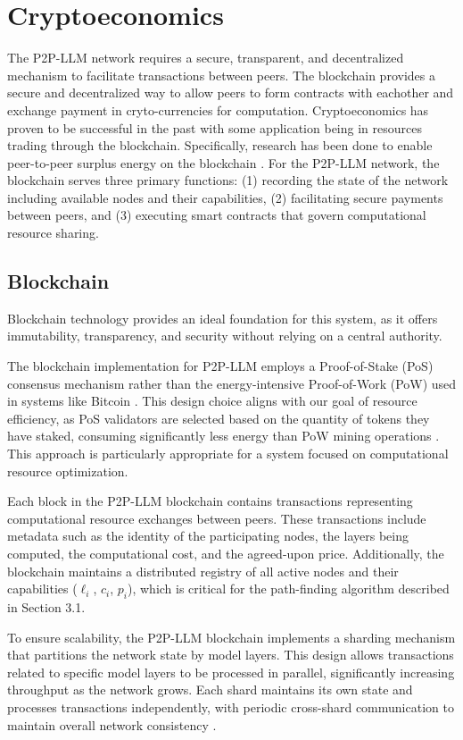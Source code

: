 \documentclass[preprint,twoside,11pt]{article}
\begin{document}
\section{Cryptoeconomics}
The P2P-LLM network requires a secure, transparent, and decentralized mechanism to facilitate transactions between peers.
The blockchain provides a secure and decentralized way to allow peers to form contracts with eachother
and exchange payment in cryto-currencies for computation.
Cryptoeconomics has proven to be successful in the past with some application being in
resources trading through the blockchain. Specifically, research has been done to enable peer-to-peer surplus energy on the blockchain \citep{WONGTHONGTHAM2021107299}.
For the P2P-LLM network, the blockchain serves three primary functions: (1) recording the state of the network including available nodes and their capabilities, (2) facilitating secure payments between peers, and (3) executing smart contracts that govern computational resource sharing.

\subsection{Blockchain}

Blockchain technology provides an ideal foundation for this system, as it offers immutability, transparency, and security without relying on a central authority.

The blockchain implementation for P2P-LLM employs a Proof-of-Stake (PoS) consensus mechanism rather than the energy-intensive Proof-of-Work (PoW) used in systems like Bitcoin \citep{nakamoto2008bitcoin}. This design choice aligns with our goal of resource efficiency, as PoS validators are selected based on the quantity of tokens they have staked, consuming significantly less energy than PoW mining operations \citep{saleh2021blockchain}. This approach is particularly appropriate for a system focused on computational resource optimization.

Each block in the P2P-LLM blockchain contains transactions representing computational resource exchanges between peers. These transactions include metadata such as the identity of the participating nodes, the layers being computed, the computational cost, and the agreed-upon price. Additionally, the blockchain maintains a distributed registry of all active nodes and their capabilities ($\ell_i$, $c_i$, $p_i$), which is critical for the path-finding algorithm described in Section 3.1.

To ensure scalability, the P2P-LLM blockchain implements a sharding mechanism that partitions the network state by model layers. This design allows transactions related to specific model layers to be processed in parallel, significantly increasing throughput as the network grows. Each shard maintains its own state and processes transactions independently, with periodic cross-shard communication to maintain overall network consistency \citep{yu2020survey}.
\end{document}
